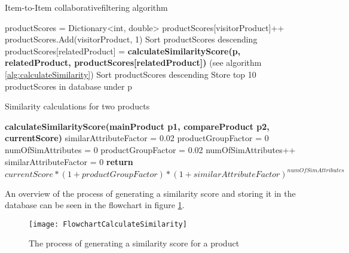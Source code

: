 \begin{algorithm}[H]
\caption{Item-to-Item \gls{collaborativefiltering} algorithm}
\label{alg:collaborativeFilter}
\begin{algorithmic}[1]
\State productScores = Dictionary<int, double>
\State productScores[visitorProduct]++
\Else
\State productScores.Add(visitorProduct, 1)
\EndIf
\EndFor
\EndFor
\State Sort productScores descending
\State productScores[relatedProduct] =
\State \textbf{calculateSimilarityScore(p, relatedProduct, productScores[relatedProduct])} (see algorithm \ref{alg:calculateSimilarity})
\EndFor
\State Sort productScores descending
\State Store top 10 productScores in database under p
\EndFor
\end{algorithmic}
\end{algorithm}

\begin{algorithm}[H]
\caption{Similarity calculations for two products }
\label{alg:calculateSimilarity}
\begin{algorithmic}[1]

\State \textbf{calculateSimilarityScore(mainProduct p1, compareProduct p2, currentScore)}
\State similarAttributeFactor = 0.02
\State productGroupFactor = 0
\State numOfSimAttributes = 0
\State productGroupFactor = 0.02
\EndIf
{}
\State numOfSimAttributes++
\EndIf
\EndFor
{}
\State similarAttributeFactor = 0
\EndIf
\State \textbf{return} \begin{math} currentScore * (1+productGroupFactor)*(1+similarAttributeFactor)^{numOfSimAttributes} \end{math}
\end{algorithmic}
\end{algorithm}

An overview of the process of generating a similarity score and storing it in the database can be seen in the flowchart in figure \ref{flowChartSimilarity}.

\begin{figure}[H]
\centering
\texttt{[image: FlowchartCalculateSimilarity]}
\caption{The process of generating a similarity score for a product}
\label{flowChartSimilarity}
\end{figure}


